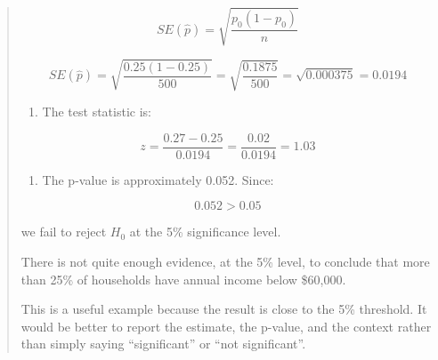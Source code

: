 \documentclass[
  letterpaper,
  DIV=11,
  numbers=noendperiod]{scrreprt}
\providecommand{\tightlist}{%
  \setlength{\itemsep}{0pt}\setlength{\parskip}{0pt}}
\begin{document}
\begin{tcolorbox}
\begin{quote}
\[
SE(\hat{p})
=
\sqrt{\frac{p_0(1-p_0)}{n}}
\]

\[
SE(\hat{p})
=
\sqrt{\frac{0.25(1-0.25)}{500}}
=
\sqrt{\frac{0.1875}{500}}
=
\sqrt{0.000375}
=
0.0194
\]

\begin{enumerate}
\def\labelenumi{\alph{enumi}.}
\setcounter{enumi}{2}
\tightlist
\item
  The test statistic is:
\end{enumerate}

\[
z =
\frac{0.27 - 0.25}{0.0194}
=
\frac{0.02}{0.0194}
=
1.03
\]

\begin{enumerate}
\def\labelenumi{\alph{enumi}.}
\setcounter{enumi}{3}
\tightlist
\item
  The p-value is approximately 0.052. Since:
\end{enumerate}

\[
0.052 > 0.05
\]

we fail to reject \(H_0\) at the 5\% significance level.

There is not quite enough evidence, at the 5\% level, to conclude that
more than 25\% of households have annual income below \$60,000.

This is a useful example because the result is close to the 5\%
threshold. It would be better to report the estimate, the p-value, and
the context rather than simply saying ``significant'' or ``not
significant''.
\end{quote}

\end{tcolorbox}
\end{document}
